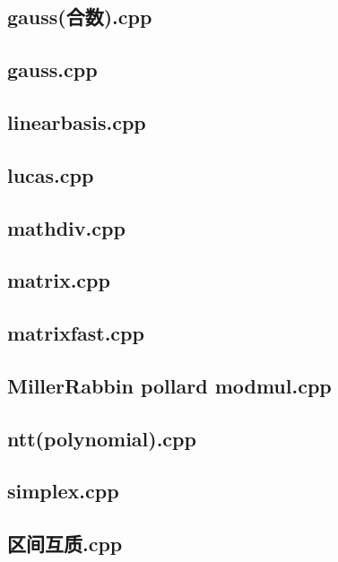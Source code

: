 \subsection{gauss(合数).cpp}


\subsection{gauss.cpp}


\subsection{linearbasis.cpp}


\subsection{lucas.cpp}


\subsection{mathdiv.cpp}


\subsection{matrix.cpp}


\subsection{matrixfast.cpp}


\subsection{MillerRabbin pollard modmul.cpp}


\subsection{ntt(polynomial).cpp}


\subsection{simplex.cpp}


\subsection{区间互质.cpp}


